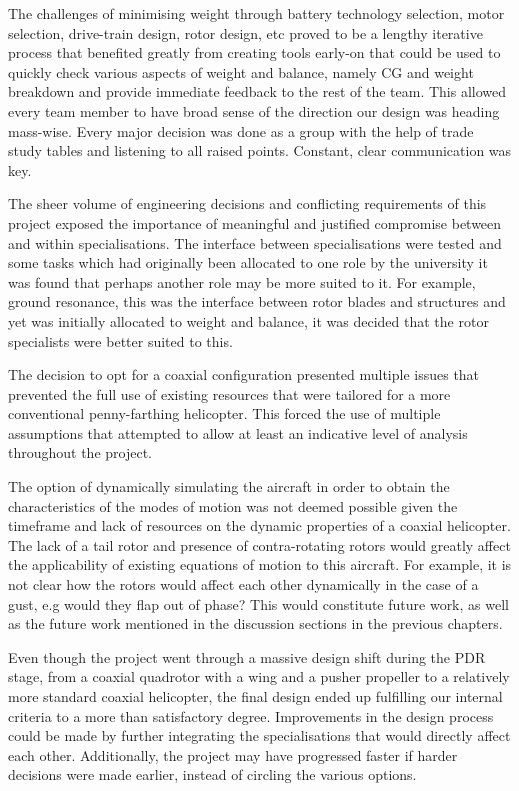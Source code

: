 \documentclass[11pt,a4paper]{article}
\begin{document}
The challenges of minimising weight through battery technology selection, motor selection, drive-train design, rotor design, etc proved to be a lengthy iterative process that benefited greatly from creating tools early-on that could be used to quickly check various aspects of weight and balance, namely CG and weight breakdown and provide immediate feedback to the rest of the team. This allowed every team member to have broad sense of the direction our design was heading mass-wise. Every major decision was done as a group with the help of trade study tables and listening to all raised points. Constant, clear communication was key.

The sheer volume of engineering decisions and conflicting requirements of this project exposed the importance of meaningful and justified compromise between and within specialisations. The interface between specialisations were tested and some tasks which had originally been allocated to one role by the university it was found that perhaps another role may be more suited to it. For example, ground resonance, this was the interface between rotor blades and structures and yet was initially allocated to weight and balance, it was decided that the rotor specialists were better suited to this.

The decision to opt for a coaxial configuration presented multiple issues that prevented the full use of existing resources that were tailored for a more conventional penny-farthing helicopter. This forced the use of multiple assumptions that attempted to allow at least an indicative level of analysis throughout the project.

The option of dynamically simulating the aircraft in order to obtain the characteristics of the modes of motion was not deemed possible given the timeframe and lack of resources on the dynamic properties of a coaxial helicopter. The lack of a tail rotor and presence of contra-rotating rotors would greatly affect the applicability of existing equations of motion to this aircraft. For example, it is not clear how the rotors would affect each other dynamically in the case of a gust, e.g would they flap out of phase? This would constitute future work, as well as the future work mentioned in the discussion sections in the previous chapters.

Even though the project went through a massive design shift during the PDR stage, from a coaxial quadrotor with a wing and a pusher propeller to a relatively more standard coaxial helicopter, the final design ended up fulfilling our internal criteria to a more than satisfactory degree.
Improvements in the design process could be made by further integrating the specialisations that would directly affect each other. Additionally, the project may have progressed faster if harder decisions were made earlier, instead of circling the various options.
\end{document}
